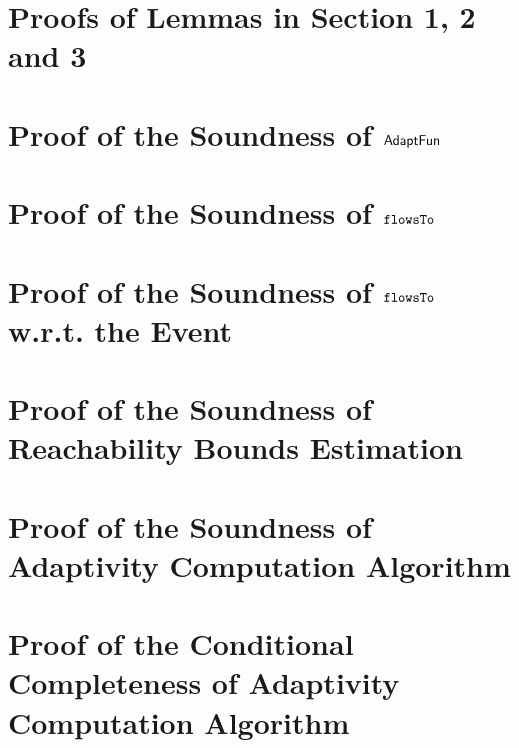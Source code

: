 \section{Proofs of Lemmas in Section 1, 2 and 3 }
\label{apdx:lemma_sec123}

\section{Proof of the Soundness of $\textsf{AdaptFun}$}
\label{apdx:adapt_soundness}

\clearpage
\section{Proof of the Soundness of $\mathtt{flowsTo}$}
\label{apdx:flowsto_soundness}

\clearpage
\section{Proof of the Soundness of $\mathtt{flowsTo}$ w.r.t. the Event}
\label{apdx:flowsto_event_soundness}

\clearpage
\clearpage
\section{Proof of the Soundness of Reachability Bounds Estimation}
\label{apdx:reachability_soundness}

\clearpage
\section{Proof of the Soundness of Adaptivity Computation Algorithm}
\label{apdx:adaptalg_soundness}

\section{Proof of the Conditional Completeness of Adaptivity Computation Algorithm}
\label{apdx:adaptalg_completeness}
